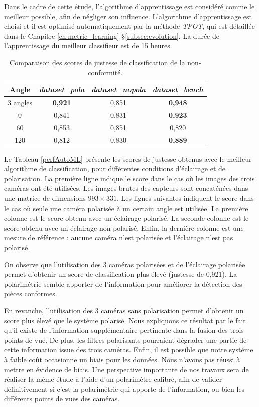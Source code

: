 Dans le cadre de cette étude, l'algorithme d'apprentissage est considéré comme le meilleur possible, afin de négliger son influence.
L'algorithme d'apprentissage est choisi et il est optimisé automatiquement par la méthode \textit{TPOT}, qui est détaillée dans le Chapitre \ref{ch:metric_learning} §\ref{subsec:evolution}.
La durée de l'apprentissage du meilleur classifieur est de 15 heures.

\begin{table}[hbtp]
	\begin{center} 
		\begin{tabular}{|c|c|c|c|}
			\hline
			\hline
			Angle & \textit{dataset\_pola} & \textit{dataset\_nopola} & \textit{dataset\_bench}\\
			\hline
			3 angles   & \textbf{0,921} & 0,851 & \textbf{0,948} \\
			0\degree   &         0,841  & 0,831 & \textbf{0,923} \\
			60\degree  &         0,853  & 0,851 &         0,820  \\
			120\degree &         0,812  & 0,830 & \textbf{0,889} \\
			\hline
		\end{tabular}
	\end{center}
	\caption{Comparaison des scores de justesse de classification de la non-conformité.}
	\label{tab:perfAutoML}
\end{table}

Le Tableau \ref{perfAutoML} présente les scores de justesse obtenus avec le meilleur algorithme de classification, pour différentes conditions d'éclairage et de polarisation.
La première ligne indique le score dans le cas où les images des trois caméras ont été utilisées.
Les images brutes des capteurs sont concaténées dans une matrice de dimensions $993\times 331$.
Les lignes suivantes indiquent le score dans le cas où seule une caméra polarisée à un certain angle est utilisée.
La première colonne est le score obtenu avec un éclairage polarisé.
La seconde colonne est le score obtenu avec un éclairage non polarisé.
Enfin, la dernière colonne est une mesure de référence : aucune caméra n'est polarisée et l'éclairage n'est pas polarisé.

On observe que l'utilisation des 3 caméras polarisées et de l'éclairage polarisée permet d'obtenir un score de classification plus élevé (justesse de 0,921).
La polarimétrie semble apporter de l'information pour améliorer la détection des pièces conformes.

En revanche, l'utilisation des 3 caméras sans polarisation permet d'obtenir un score plus élevé que le système polarisé.
Nous expliquons ce résultat par le fait qu'il existe de l'information supplémentaire pertinente dans la fusion des trois points de vue.
De plus, les filtres polarisants pourraient dégrader une partie de cette information issue des trois caméras.
Enfin, il est possible que notre système à faible coût occasionne un biais pour les données.
Nous n'avons pas réussi à mettre en évidence de biais.
Une perspective importante de nos travaux sera de réaliser la même étude à l'aide d'un polarimètre calibré, afin de valider définitivement si c'est la polarimétrie qui apporte de l'information, ou bien les différents points de vues des caméras.

